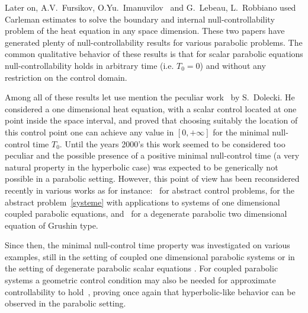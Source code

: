 \documentclass[AHL,Unicode,longabstracts]{cedram}
\begin{document}
Later on, A.V.~Fursikov, O.Yu.~Imanuvilov~\cite{FursikovImanuvilov96} and G.~Lebeau, L.~Robbiano \cite{LebeauRobbiano95} used Carleman estimates to solve the boundary and internal null-controllab\-ility problem of the heat equation in any space dimension. These two papers have generated plenty of null-controllability results for various parabolic problems. The common qualitative behavior of these results is that for scalar parabolic equations null-controllability holds in arbitrary time (i.e. $T_0 = 0$) and without any restriction on the control domain.

Among all of these results let use mention the peculiar work~\cite{Dolecki73} by S.~Dolecki. He considered a one dimensional heat equation, with a scalar control located at one point inside the space interval, and proved that choosing suitably the location of this control point one can achieve any value in $[0,+\infty]$ for the minimal null-control time $T_0$. Until the years 2000's this work seemed to be considered too peculiar and the possible presence of a positive minimal null-control time (a very natural property in the hyperbolic case) was expected to be generically not possible in a parabolic setting. However, this point of view has been reconsidered recently in various works as for instance:~\cite{AKBDK05} for abstract control problems, \cite{AmmarKhodjaBenabdallahGonzalez-BurgosdeTeresa:2014} for the abstract problem~\eqref{systeme} with applications to systems of one dimensional coupled parabolic equations, and~\cite{BeauchardCannarsaGuglielmi} for a degenerate parabolic two dimensional equation of Grushin type.

Since then, the minimal null-control time property was investigated on various examples, still in the setting of coupled one dimensional parabolic systems \cite{AKBGBdT_JMAA16,Duprez_Tmin2017,Ouaili18,Samb18} or in the setting of degenerate parabolic scalar equations \cite{BeauchardCannarsa17, BeauchardDardeErvedoza, BHHR_Kolmogorov, BeauchardMillerMorancey_Tmin, DuprezKoenig}. For coupled parabolic systems a geometric control condition may also be needed for approximate controllability to hold~\cite{BoyerOlive14, Olive13}, proving once again that hyperbolic-like behavior can be observed in the parabolic setting.
\end{document}
